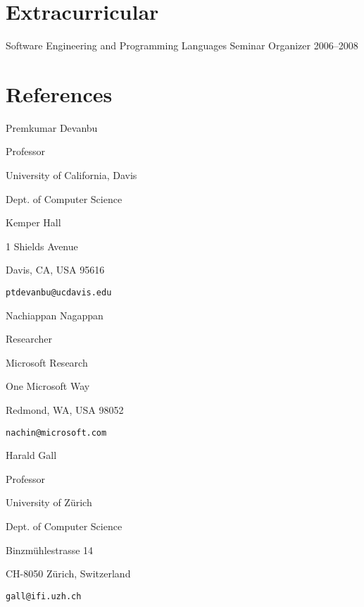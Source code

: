 \documentclass[margin,line,article,letterpaper]{res}
\newenvironment{list1}{
  \begin{list}{}{%
      \setlength{\itemsep}{0in}
      \setlength{\parsep}{0in} \setlength{\parskip}{0in}
      \setlength{\topsep}{0in} \setlength{\partopsep}{0in} 
      \setlength{\leftmargin}{0.17in}}}{\end{list}}
\newenvironment{list2}{
  \begin{list}{$\bullet$}{%
      \setlength{\itemsep}{0in}
      \setlength{\parsep}{0in} \setlength{\parskip}{0in}
      \setlength{\topsep}{0in} \setlength{\partopsep}{0in} 
      \setlength{\leftmargin}{0.2in}}}{\end{list}}
\newcommand{\timespan}[1]{#1}
\begin{document}
\begin{resume}
\begin{comment}
I don't think anyone cares about this
\section{Technical Skills} 
\begin{list2}
\item Proficient:  C, Java, Python, C++, PostgreSQL, MySQL, Ruby, R, \LaTeX
\item Familiar: Lisp, Prolog, C\#, SML
\end{list2}
\end{comment}

\section{Extracurricular}
Software Engineering and Programming Languages Seminar Organizer \hfill \timespan{2006--2008}

\section{References}

Premkumar Devanbu
\begin{list1}
\item Professor
\item University of California, Davis
\item Dept. of Computer Science
\item Kemper Hall
\item 1 Shields Avenue
\item Davis, CA, USA 95616
\item \texttt{ptdevanbu@ucdavis.edu}
\end{list1}

Nachiappan Nagappan
\begin{list1}
\item Researcher
\item Microsoft Research
\item One Microsoft Way
\item Redmond, WA, USA 98052
\item \texttt{nachin@microsoft.com}
\end{list1}

Harald Gall
\begin{list1}
\item Professor
\item University of Z\"urich
\item Dept. of Computer Science
\item Binzm\"uhlestrasse 14
\item CH-8050 Z\"urich, Switzerland
\item \texttt{gall@ifi.uzh.ch}
\end{list1}


\end{resume}
\end{document}
